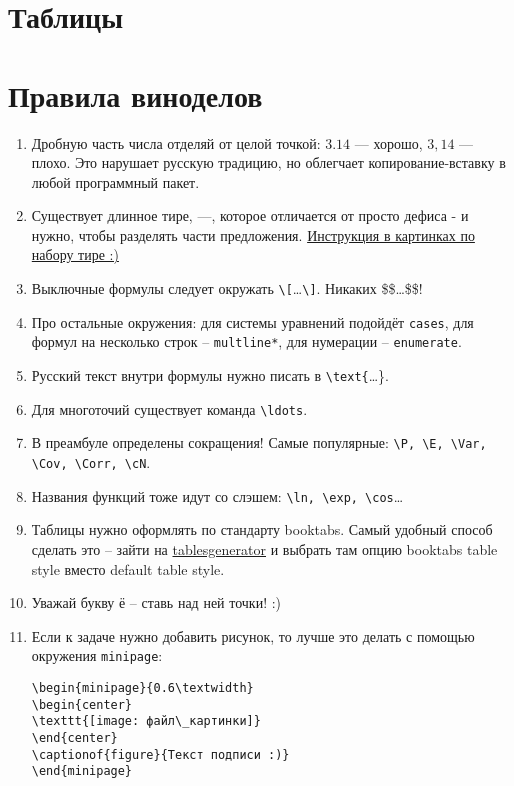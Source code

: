 \documentclass[11pt, openany]{book}
\theoremstyle{definition}
\begin{document}






\chapter{Таблицы}




\chapter{Правила виноделов}

\begin{enumerate}



\item Дробную часть числа отделяй от целой точкой: $3.14$ — хорошо, $3{,}14$ — плохо. Это нарушает русскую традицию, но облегчает копирование-вставку в любой программный пакет.
\item Существует длинное тире, —, которое отличается от просто дефиса - и нужно, чтобы разделять части предложения. \href{https://ru.wikihow.com/напечатать-тире}{Инструкция в картинках по набору тире :)}
\item Выключные формулы следует окружать \verb|\[|\ldots\verb|\]|. Никаких \$\$\ldots\$\$!
\item Про остальные окружения: для системы уравнений подойдёт \verb|cases|, для формул на несколько строк – \verb|multline*|, для нумерации – \verb|enumerate|.
\item Русский текст внутри формулы нужно писать в \verb|\text{|\ldots\}.
\item Для многоточий существует команда \verb|\ldots|.
\item В преамбуле определены сокращения! Самые популярные: \verb|\P, \E, \Var, \Cov, \Corr, \cN|.
\item Названия функций тоже идут со слэшем: \verb|\ln, \exp, \cos|\ldots
\item Таблицы нужно оформлять по стандарту booktabs. Самый удобный способ сделать это – зайти на
\href{https://www.tablesgenerator.com}{tablesgenerator} и выбрать там опцию booktabs table style вместо default table style.
\item Уважай букву ё – ставь над ней точки! :)


\item Если к задаче нужно добавить рисунок, то лучше это делать с помощью окружения \verb|minipage|:


\begin{verbatim}
\begin{minipage}{0.6\textwidth}
\begin{center}
\texttt{[image: файл\_картинки]}
\end{center}
\captionof{figure}{Текст подписи :)}
\end{minipage}
\end{verbatim}


\end{enumerate}
\end{document}

